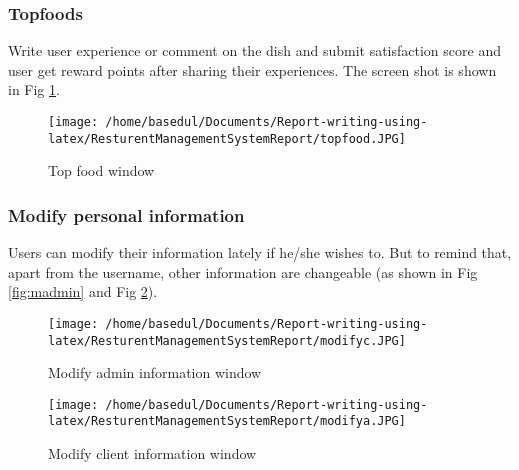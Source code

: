 \documentclass[12pt,a4paper]{article}
\newcommand\tab[1][1cm]{\hspace*{#1}}
\begin{document}
		\subsubsection{Topfoods}
			\tab Write user experience or comment on the dish and submit satisfaction score and user get reward points after sharing their experiences. The screen shot is shown in Fig \ref{fig:topfood}. 
			\begin{figure}[H]
		\centering
		\texttt{[image: /home/basedul/Documents/Report-writing-using-latex/ResturentManagementSystemReport/topfood.JPG]}
		\caption{Top food window}
		\label{fig:topfood} 
		\end{figure}
		
		
		\subsubsection{Modify personal information}
	\tab Users can modify their information lately if he/she wishes to. But to remind that, apart from the username, other information are changeable (as shown in Fig \ref{fig:madmin} and Fig \ref{fig:mclient}).
	
			\begin{figure}[H]
		\centering
		\texttt{[image: /home/basedul/Documents/Report-writing-using-latex/ResturentManagementSystemReport/modifyc.JPG]}
		\caption{Modify admin information window}
		\label{fig:madmin} 
		
		
		\vspace{2cm}
		
		
		\texttt{[image: /home/basedul/Documents/Report-writing-using-latex/ResturentManagementSystemReport/modifya.JPG]}
		\caption{Modify client information window}
		\label{fig:mclient} 
		\end{figure}	
						
		
\end{document}
